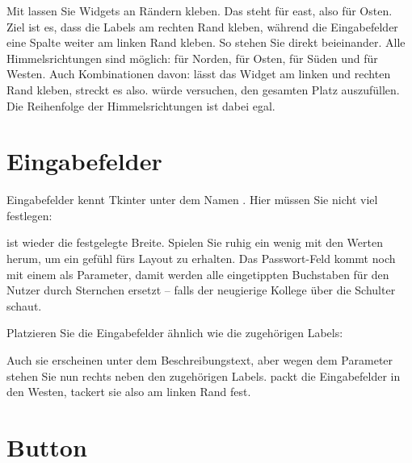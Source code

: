 Mit  lassen Sie Widgets an Rändern kleben. Das  steht für east, also für Osten. Ziel ist es, dass die Labels am rechten Rand kleben, während die Eingabefelder eine Spalte weiter am linken Rand kleben. So stehen Sie direkt beieinander. Alle Himmelsrichtungen sind möglich:  für Norden,  für Osten,  für Süden und  für Westen. Auch Kombinationen davon:  lässt das Widget am linken und rechten Rand kleben, streckt es also.  würde versuchen, den gesamten Platz auszufüllen. Die Reihenfolge der Himmelsrichtungen ist dabei egal.

\section{Eingabefelder}

Eingabefelder kennt Tkinter unter dem Namen . Hier müssen Sie nicht viel festlegen:

\medskip



\medskip

 ist wieder die festgelegte Breite. Spielen Sie ruhig ein wenig mit den Werten herum, um ein gefühl fürs Layout zu erhalten. Das Passwort-Feld kommt noch mit einem  als Parameter, damit werden alle eingetippten Buchstaben für den Nutzer durch Sternchen ersetzt -- falls der neugierige Kollege über die Schulter schaut.

Platzieren Sie die Eingabefelder ähnlich wie die zugehörigen Labels:

\medskip



\medskip

Auch sie erscheinen unter dem Beschreibungstext, aber wegen dem Parameter  stehen Sie nun rechts neben den zugehörigen Labels.  packt die Eingabefelder in den Westen, tackert sie also am linken Rand fest.



\section{Button}

